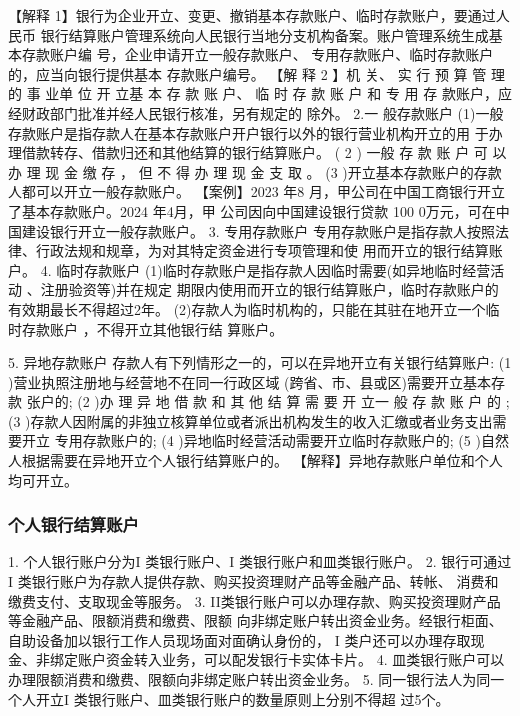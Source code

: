 \documentclass[UTF8,12pt]{ctexart}
\numberwithin{equation}{section} %
\numberwithin{figure}{section}
\numberwithin{table}{section}
\begin{document}
	【解释 1】银行为企业开立、变更、撤销基本存款账户、临时存款账户，要通过人民币
	银行结算账户管理系统向人民银行当地分支机构备案。账户管理系统生成基本存款账户编
	号，企业申请开立一般存款账户、 专用存款账户、临时存款账户的，应当向银行提供基本
	存款账户编号。
	【解 释 2 】机 关、 实 行 预 算 管 理 的 事 业单 位 开 立基 本 存 款 账 户、 临 时 存 款 账 户 和 专 用 存
	款账户，应经财政部门批准并经人民银行核准，另有规定的 除外。
	2.一 般存款账户
	(1)一般存款账户是指存款人在基本存款账户开户银行以外的银行营业机构开立的用 于办
	理借款转存、借款归还和其他结算的银行结算账户。
	( 2 ) 一般 存 款 账 户 可 以 办 理 现 金 缴 存 ， 但 不 得 办 理 现 金 支 取 。
	(3 )开立基本存款账户的存款人都可以开立一般存款账户。
	【案例】2023 年8 月，甲公司在中国工商银行开立了基本存款账户。2024 年4月，甲
	公司因向中国建设银行贷款 100 0万元，可在中国建设银行开立一般存款账户。
	3. 专用存款账户
	专用存款账户是指存款人按照法律、行政法规和规章，为对其特定资金进行专项管理和使
	用而开立的银行结算账户。
	4. 临时存款账户
	(1)临时存款账户是指存款人因临时需要(如异地临时经营活动 、注册验资等)并在规定
	期限内使用而开立的银行结算账户，临时存款账户的有效期最长不得超过2年。
	(2)存款人为临时机构的，只能在其驻在地开立一个临时存款账户 ，不得开立其他银行结
	算账户。
	
	5. 异地存款账户
	存款人有下列情形之一的，可以在异地开立有关银行结算账户:
	(1 )营业执照注册地与经营地不在同一行政区域 (跨省、市、县或区)需要开立基本存款
	张户的;
	(2 )办 理 异 地 借 款 和 其 他 结 算 需 要 开 立一 般 存 款 账 户 的 ;
	(3 )存款人因附属的非独立核算单位或者派出机构发生的收入汇缴或者业务支出需要开立
	专用存款账户的;
	(4 )异地临时经营活动需要开立临时存款账户的;
	(5 )自然人根据需要在异地开立个人银行结算账户的。
	【解释】异地存款账户单位和个人均可开立。
	
	
	
	\subsubsection{个人银行结算账户}
	1. 个人银行账户分为I 类银行账户、I 类银行账户和皿类银行账户。
	2. 银行可通过I 类银行账户为存款人提供存款、购买投资理财产品等金融产品、转帐、
	消费和缴费支付、支取现金等服务。
	3. II类银行账户可以办理存款、购买投资理财产品等金融产品、限额消费和缴费、限额
	向非绑定账户转出资金业务。经银行柜面、自助设备加以银行工作人员现场面对面确认身份的，
	I 类户还可以办理存取现金、非绑定账户资金转入业务，可以配发银行卡实体卡片。
	4. 皿类银行账户可以办理限额消费和缴费、限额向非绑定账户转出资金业务。
	5. 同一银行法人为同一个人开立I 类银行账户、皿类银行账户的数量原则上分别不得超
	过5个。
	 
\end{document}
